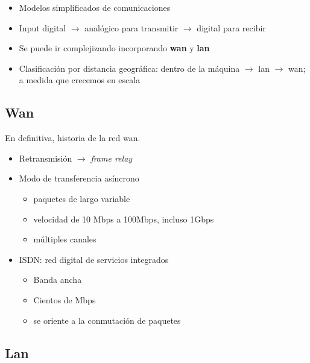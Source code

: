 \begin{itemize}
    \item Modelos simplificados de comunicaciones 
    \item Input digital \(\rightarrow\) analógico para transmitir \(\rightarrow\) digital para recibir
    \item Se puede ir complejizando incorporando \textbf{wan} y \textbf{lan}
    \item Clasificación por distancia geográfica: 
    dentro de la máquina \(\rightarrow\) lan \(\rightarrow\) wan;
    a medida que crecemos en escala 
\end{itemize}

\subsection{Wan}

En definitiva, historia de la red wan.

\begin{itemize}
    \item Retransmisión \(\rightarrow\) \textit{frame relay}
    \item Modo de transferencia asíncrono
    \begin{itemize}
        \item paquetes de largo variable
        \item velocidad de 10 Mbps a 100Mbps, incluso 1Gbps
        \item múltiples canales 
    \end{itemize}
    \item ISDN: red digital de servicios integrados
    \begin{itemize}
        \item Banda ancha
        \item Cientos de Mbps 
        \item se oriente a la conmutación de paquetes 
    \end{itemize}
\end{itemize}

\subsection{Lan}

